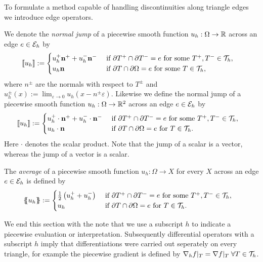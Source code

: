 To formulate a method capable of handling discontinuities along triangle edges we introduce edge operators.   
\begin{definition} \label{def: edge operators}
We denote the \emph{normal jump} of  a piecewise smooth function $u_h:\Omega \rightarrow \mathbb{R}$ across an edge $e \in \mathcal{E}_h$ by
\begin{align*}
	\llbracket u_h \rrbracket&:= 
	\begin{cases}
		u_h^+  \mathbf n^+ + u_h^- \mathbf n^-  &\text{ if } \partial T^+ \cap \partial T^- = e \text{ for some }T^+,T^- \in \mathcal{T}_h, \\
		u_h \mathbf n 	 &\text{ if } \partial T \cap \partial \Omega = e \text{ for some } T \in \mathcal{T}_h,
	\end{cases}	
\end{align*}
where $n^\pm$ are the normals with respect to $T^\pm$ and  $u_h^\pm(x) := \lim_{\varepsilon \rightarrow 0} u_h(x-n^\pm \varepsilon)$.
Likewise we define the normal jump of a piecewise smooth function $u_h:\Omega \rightarrow \mathbb{R}^2$ across an edge $e \in \mathcal{E}_h$ by
\begin{align*}
	\llbracket u_h \rrbracket&:= 
	\begin{cases}
		u_h^+ \cdot \mathbf n^+ + u_h^-\cdot  \mathbf n^-  &\text{ if } \partial T^+ \cap \partial T^- = e \text{ for some }T^+,T^- \in \mathcal{T}_h,\\
		u_h\cdot \mathbf n 	 &\text{ if } \partial T \cap \partial \Omega = e \text{ for }T\in \mathcal{T}_h.
	\end{cases}	
\end{align*}
Here $\cdot$ denotes the scalar product.
Note that the jump of a scalar is a vector, whereas the jump of a vector is a scalar.

The \emph{average} of a piecewise smooth function $u_h:\Omega \rightarrow X$ for every $X$ across an edge $e \in \mathcal{E}_h$ is defined by
\begin{align*}
	\{\!\!\{ u_h \}\!\!\} &:= 
	\begin{cases}
	\frac 1 2 \left(u_h^+ + u_h^-\right) &\text{ if } \partial T^+ \cap \partial T^- = e \text{ for some }T^+,T^- \in \mathcal{T}_h, \\
	 u_h &\text{ if } \partial T \cap \partial \Omega = e \text{ for }T\in \mathcal{T}_h.
	\end{cases}
\end{align*}
\end{definition}

We end this section with the note that we use a subscript $h$ to indicate a piecewise evaluation or interpretation.  Subsequently differential operators with a subscript $h$ imply that differentiations were carried out seperately on every triangle, for example the piecewise gradient is defined by $\nabla_h f |_T = \nabla f |_T \; \forall T \in \mathcal{T}_h$. 



